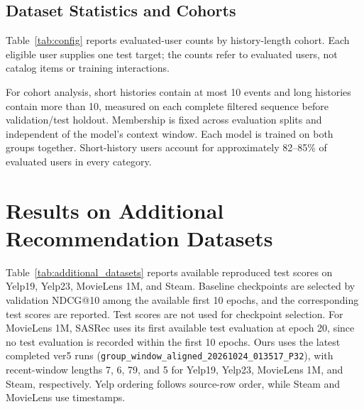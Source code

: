 ﻿\documentclass[sigconf,anonymous,review]{acmart}
\begin{document}
\subsection{Dataset Statistics and Cohorts}
\label{app:dataset_statistics}
Table~\ref{tab:config} reports evaluated-user counts by history-length cohort. Each eligible user supplies one test target; the counts refer to evaluated users, not catalog items or training interactions.

\begin{table}[!tbp]
    \centering
    \setlength{\tabcolsep}{3.2pt}
    \renewcommand{\arraystretch}{1.12}
    \caption{Evaluated-user counts by history-length cohort. Short and long histories contain $\leq10$ and $>10$ events.}
    \label{tab:config}
\end{table}

For cohort analysis, short histories contain at most 10 events and long histories contain more than 10, measured on each complete filtered sequence before validation/test holdout. Membership is fixed across evaluation splits and independent of the model's context window. Each model is trained on both groups together. Short-history users account for approximately 82--85\% of evaluated users in every category.

\section{Results on Additional Recommendation Datasets}
\label{app:additional_results}
Table~\ref{tab:additional_datasets} reports available reproduced test scores on Yelp19, Yelp23, MovieLens 1M, and Steam. Baseline checkpoints are selected by validation NDCG@10 among the available first 10 epochs, and the corresponding test scores are reported. Test scores are not used for checkpoint selection. For MovieLens 1M, SASRec uses its first available test evaluation at epoch 20, since no test evaluation is recorded within the first 10 epochs. Ours uses the latest completed ver5 runs (\texttt{group\_window\_aligned\_20261024\_013517\_P32}), with recent-window lengths 7, 6, 79, and 5 for Yelp19, Yelp23, MovieLens 1M, and Steam, respectively. Yelp ordering follows source-row order, while Steam and MovieLens use timestamps.
\end{document}
